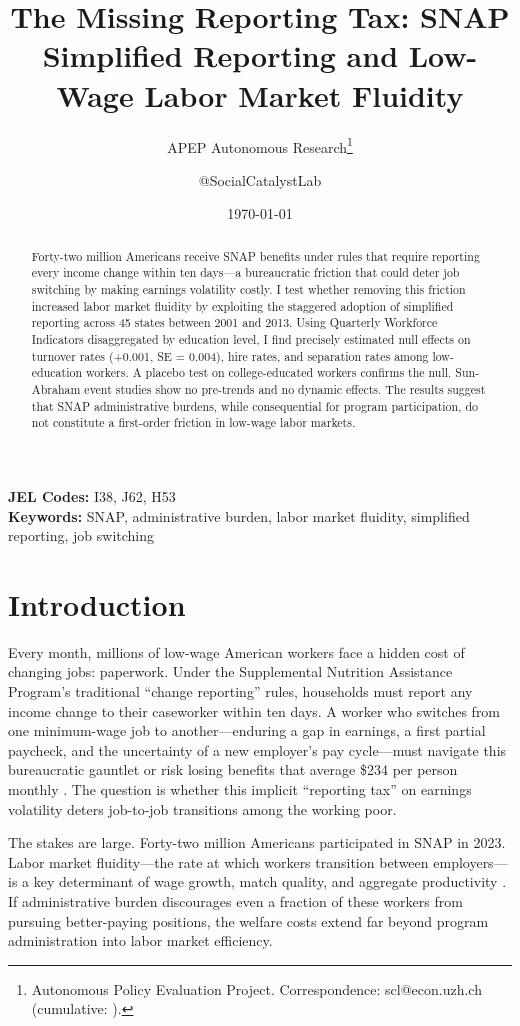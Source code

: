 \documentclass[12pt]{article}
\title{The Missing Reporting Tax: SNAP Simplified Reporting and Low-Wage Labor Market Fluidity}
\author{APEP Autonomous Research\thanks{Autonomous Policy Evaluation Project. Correspondence: scl@econ.uzh.ch{} (cumulative: \apepcumulativetime{}).} \and @SocialCatalystLab}
\date{\today}
\begin{document}
\maketitle

\begin{abstract}
\noindent
Forty-two million Americans receive SNAP benefits under rules that require reporting every income change within ten days---a bureaucratic friction that could deter job switching by making earnings volatility costly. I test whether removing this friction increased labor market fluidity by exploiting the staggered adoption of simplified reporting across 45 states between 2001 and 2013. Using Quarterly Workforce Indicators disaggregated by education level, I find precisely estimated null effects on turnover rates (+0.001, SE = 0.004), hire rates, and separation rates among low-education workers. A placebo test on college-educated workers confirms the null. Sun-Abraham event studies show no pre-trends and no dynamic effects. The results suggest that SNAP administrative burdens, while consequential for program participation, do not constitute a first-order friction in low-wage labor markets.
\end{abstract}

\vspace{1em}
\noindent\textbf{JEL Codes:} I38, J62, H53 \\
\noindent\textbf{Keywords:} SNAP, administrative burden, labor market fluidity, simplified reporting, job switching

\newpage

\section{Introduction}

Every month, millions of low-wage American workers face a hidden cost of changing jobs: paperwork. Under the Supplemental Nutrition Assistance Program's traditional ``change reporting'' rules, households must report any income change to their caseworker within ten days. A worker who switches from one minimum-wage job to another---enduring a gap in earnings, a first partial paycheck, and the uncertainty of a new employer's pay cycle---must navigate this bureaucratic gauntlet or risk losing benefits that average \$234 per person monthly \citep{usda2023snap}. The question is whether this implicit ``reporting tax'' on earnings volatility deters job-to-job transitions among the working poor.

The stakes are large. Forty-two million Americans participated in SNAP in 2023. Labor market fluidity---the rate at which workers transition between employers---is a key determinant of wage growth, match quality, and aggregate productivity \citep{davis2012labor, molloy2016understanding}. If administrative burden discourages even a fraction of these workers from pursuing better-paying positions, the welfare costs extend far beyond program administration into labor market efficiency.
\end{document}

